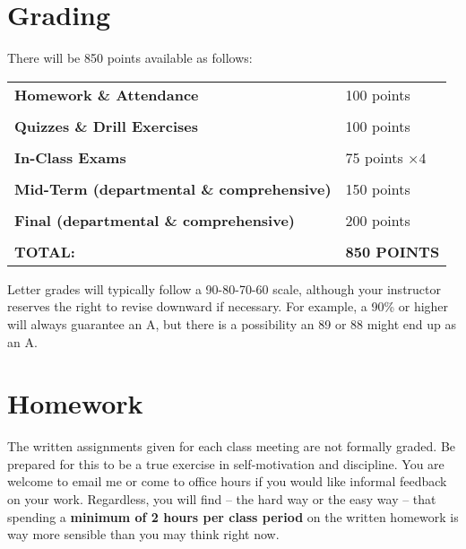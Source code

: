 \documentclass[margin,line,pifont,palatino,courier]{res}
\begin{document}
\begin{resume}
\section{\sc Grading} There will be 850 points available as follows:

\vspace{-.1in}
\begin{center}
\begin{supertabular}{@{}p{0.6\textwidth} l}
	{\bf Homework \& Attendance} & 100 points \\
	& \\	
{\bf Quizzes \& Drill Exercises} & 100 points \\
 & \\
 {\bf In-Class Exams} & 75 points $\times 4$ \\
 & \\
{\bf Mid-Term (departmental \& comprehensive)} & 150 points \\ 
 & \\
{\bf Final (departmental \& comprehensive)} & 200 points \\
 & \\
{\bf TOTAL:} & {\bf 850 POINTS} \\
\end{supertabular}
\end{center}

\vspace{-.1in}
Letter grades will typically follow a 90-80-70-60 scale, although your instructor reserves the right to revise downward if necessary.  For example, a 90\% or higher will always guarantee an A, but there is a possibility an 89 or 88 might end up as an A.

\section{\sc Homework} The written assignments given for each class meeting are not formally graded.  Be prepared for this to be a true exercise in self-motivation and discipline.  You are welcome to email me or come to office hours if you would like informal feedback on your work.  Regardless, you will find -- the hard way or the easy way -- that spending a {\bf minimum of 2 hours per class period} on the written homework is way more sensible than you may think right now.     


\end{resume}
\end{document}
